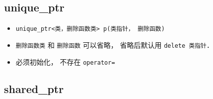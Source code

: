 
\begin{issues}
\issueDraft
\end{issues}

\subsection{unique_ptr}
\begin{itemize}
\item \verb|unique_ptr<类，删除函数类> p(类指针， 删除函数)|
\item \verb|删除函数类| 和 \verb|删除函数| 可以省略， 省略后默认用 \verb|delete 类指针|．
\item 必须初始化， 不存在 \verb|operator=|
\end{itemize}

\subsection{shared_ptr}